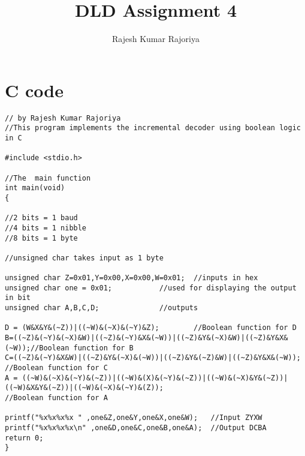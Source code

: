 \documentclass{article}
\title{DLD Assignment 4}
\author{Rajesh Kumar Rajoriya}
\begin{document}
\maketitle

\section{C code}

\begin{lstlisting}[style=CStyle]
// by Rajesh Kumar Rajoriya
//This program implements the incremental decoder using boolean logic in C

#include <stdio.h>

//The  main function
int main(void)
{

//2 bits = 1 baud
//4 bits = 1 nibble
//8 bits = 1 byte

//unsigned char takes input as 1 byte

unsigned char Z=0x01,Y=0x00,X=0x00,W=0x01;	//inputs in hex	
unsigned char one = 0x01;			//used for displaying the output in bit
unsigned char A,B,C,D;				//outputs

D = (W&X&Y&(~Z))|((~W)&(~X)&(~Y)&Z);		//Boolean function for D
B=((~Z)&(~Y)&(~X)&W)|((~Z)&(~Y)&X&(~W))|((~Z)&Y&(~X)&W)|((~Z)&Y&X&(~W));//Boolean function for B
C=((~Z)&(~Y)&X&W)|((~Z)&Y&(~X)&(~W))|((~Z)&Y&(~Z)&W)|((~Z)&Y&X&(~W));	//Boolean function for C
A = ((~W)&(~X)&(~Y)&(~Z))|((~W)&(X)&(~Y)&(~Z))|((~W)&(~X)&Y&(~Z))|((~W)&X&Y&(~Z))|((~W)&(~X)&(~Y)&(Z));
//Boolean function for A

printf("%x%x%x%x " ,one&Z,one&Y,one&X,one&W);	//Input ZYXW
printf("%x%x%x%x\n" ,one&D,one&C,one&B,one&A);	//Output DCBA
return 0;
}
\end{lstlisting}
\end{document}
